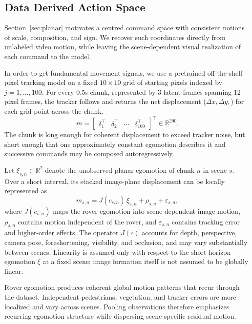 \documentclass[letterpaper]{article} %
\begin{document}
\subsection{Data Derived Action Space}
\label{sec:pca}

Section~\ref{sec:planar} motivates a centred command space with consistent
notions of scale, composition, and sign. We recover such coordinates directly
from unlabeled video motion, while leaving the scene-dependent visual
realization of each command to the model.

In order to get fundamental movement signals, we use a pretrained off-the-shelf pixel tracking model \cite{cotracker} on a fixed $10\times10$ grid of starting pixels indexed by $j=1,\dots,100$. For every $0.5$s chunk, represented by 3 latent frames spanning 12 pixel frames, the tracker follows and returns the net displacement ($\Delta x, \Delta y,$) for each grid point across the chunk.
\begin{equation}
    m =
    \begin{bmatrix}
        \delta_1^\top &
        \delta_2^\top &
        \cdots &
        \delta_{100}^\top
    \end{bmatrix}^{\top}
    \in\mathbb{R}^{200}.
    \label{eq:movement_vector}
\end{equation}
The chunk is long enough for coherent displacement to exceed tracker noise,
but short enough that one approximately constant egomotion describes it and
successive commands may be composed autoregressively.

Let $\xi_{s,n}\in\mathbb{R}^2$ denote the unobserved planar egomotion of
chunk $n$ in scene $s$. Over a short interval, its stacked image-plane
displacement can be locally represented as
\begin{equation}
    m_{s,n}
    =
    J(c_{s,n})\,\xi_{s,n}
    +
    \rho_{s,n}
    +
    \varepsilon_{s,n},
    \label{eq:tracked_motion_model}
\end{equation}
where $J(c_{s,n})$ maps the rover egomotion into scene-dependent image
motion, $\rho_{s,n}$ contains motion independent of the rover, and
$\varepsilon_{s,n}$ contains tracking error and higher-order effects. The operator $J(c)$ accounts for depth, perspective, camera pose,
foreshortening, visibility, and occlusion, and may vary substantially between
scenes. Linearity is assumed only with respect to the short-horizon
egomotion $\xi$ at a fixed scene; image formation itself is not assumed to
be globally linear.

Rover egomotion produces coherent global motion patterns that recur
through the dataset. Independent pedestrians, vegetation, and tracker
errors are more localized and vary across scenes. Pooling observations
therefore emphasizes recurring egomotion structure while dispersing
scene-specific residual motion.
\end{document}
